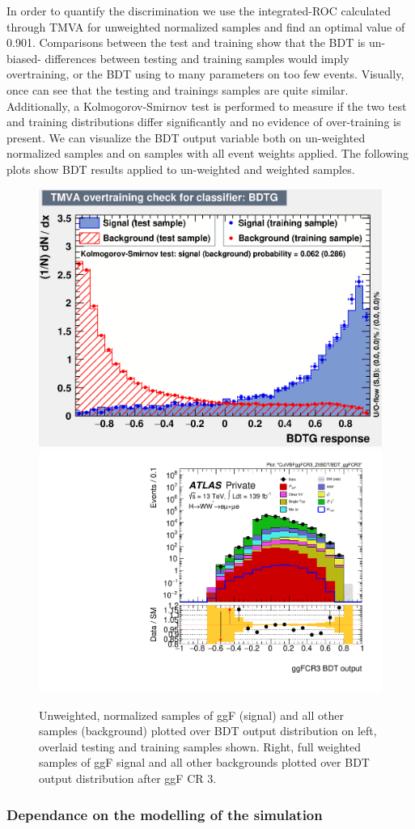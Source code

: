 In order to quantify the discrimination we use the integrated-ROC calculated through TMVA for unweighted normalized samples and find an optimal value of 0.901. Comparisons between the test and training show that the BDT is un-biased- differences between testing and training samples would imply overtraining, or the BDT using to many parameters on too few events. Visually, once can see that the testing and trainings samples are quite similar. Additionally, a Kolmogorov-Smirnov test is performed to measure if the two test and training distributions differ significantly and no evidence of over-training is present. We can visualize the BDT output variable both on un-weighted normalized samples and on samples with all event weights applied. The following plots show BDT results applied to un-weighted and weighted samples.

\begin{figure}[!htbp]
\centering
  \includegraphics[width=.45\linewidth]{Pictures/overtrain_BDTG.eps}
  \includegraphics[width=.35\linewidth]{Pictures/run2-emme-CutVBFggFCR3_ZttBDT-BDT_ggFCR3-log.pdf}
\caption{Unweighted, normalized samples of ggF (signal) and all other samples (background) plotted over BDT output distribution on left, overlaid testing and training samples shown. Right, full weighted samples of ggF signal and all other backgrounds plotted over BDT output distribution after ggF CR 3.}
\label{fig:ggFCR3BDTresult}
\end{figure}

\subsubsection{Dependance on the modelling of the simulation} 

